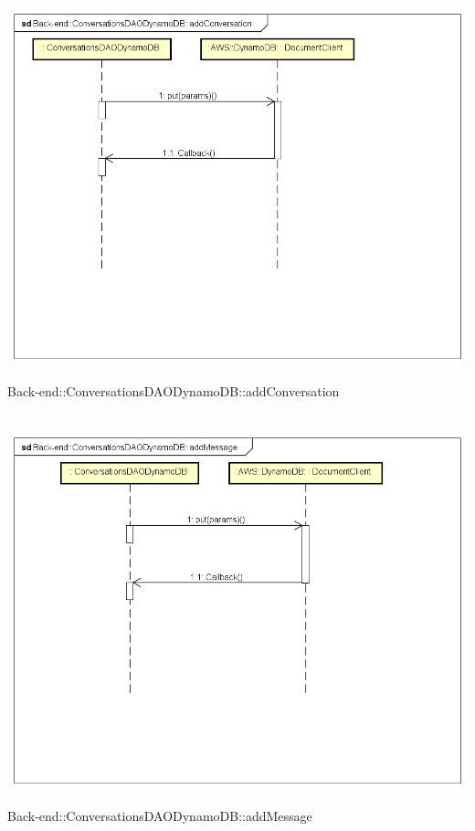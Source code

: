 \\ \includegraphics[width=\textwidth,height=\textheight,keepaspectratio]{images/diagrams/back-end/Ufficial_Backend/Back-end__ConversationsDAODynamoDB__addConversation.png} 	\caption{Back-end::ConversationsDAODynamoDB::addConversation}
\\ \includegraphics[width=\textwidth,height=\textheight,keepaspectratio]{images/diagrams/back-end/Ufficial_Backend/Back-end__ConversationsDAODynamoDB__addMessage.png} 	\caption{Back-end::ConversationsDAODynamoDB::addMessage}
